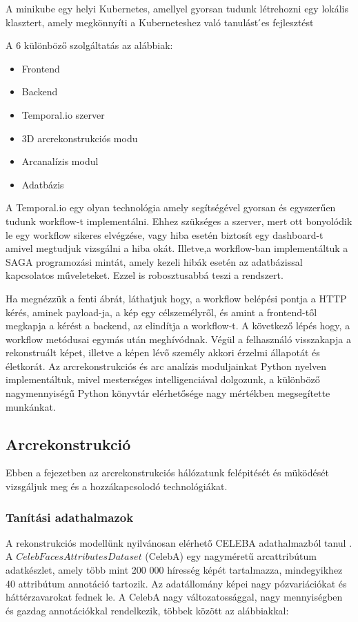 \documentclass[12pt,a4]{article}
\begin{document}
    \newpage
	\begin{mdframed}
		A minikube egy helyi Kubernetes, amellyel gyorsan tudunk létrehozni
		egy lokális klasztert, amely megkönnyíti a Kuberneteshez való tanulást
		́es fejlesztést
	\end{mdframed}

	A 6 különböző szolgáltatás az alábbiak:
	\begin{itemize}
		\item Frontend
		\item Backend
		\item Temporal.io szerver
		\item 3D arcrekonstrukciós modu
		\item Arcanalízis modul
		\item Adatbázis
	\end{itemize}

	A Temporal.io egy olyan technológia amely segítségével gyorsan és
	egyszerűen tudunk workflow-t implementálni. Ehhez szükséges a szerver,
	mert ott bonyolódik le egy workflow sikeres elvégzése, vagy hiba esetén
	biztosít egy dashboard-t amivel megtudjuk vizsgálni a hiba okát. Illetve,a
	workflow-ban implementáltuk a SAGA programozási mintát, amely kezeli
	hibák esetén az adatbázissal kapcsolatos műveleteket. Ezzel is robosztusabbá
	teszi a rendszert.
	
	Ha megnézzük a fenti ábrát, láthatjuk hogy, a workflow belépési pontja a HTTP kérés, aminek payload-ja, a kép egy célszemélyről, és amint a
	frontend-től megkapja a kérést a backend, az elindítja a workflow-t. A következő lépés hogy, a workflow metódusai egymás után meghívódnak.
	Végül a felhasználó visszakapja a rekonstruált képet, illetve a képen lévő személy akkori érzelmi állapotát és életkorát. Az arcrekonstrukciós és arc
	analízis moduljainkat Python nyelven implementáltuk, mivel mesterséges intelligenciával dolgozunk, a különböző nagymennyiségű Python könyvtár
	elérhetősége nagy mértékben megsegítette munkánkat.
	
	
	\newpage
    \subsection{Arcrekonstrukció}

    Ebben a fejezetben az arcrekonstrukciós hálózatunk felépitését és müködését vizsgáljuk meg és a hozzákapcsolodó technológiákat.

    \subsubsection{Tanítási adathalmazok}
	A rekonstrukciós modellünk nyilvánosan elérhető CELEBA adathalmazból tanul \cite{celeba}. A $CelebFaces Attributes Dataset$ (CelebA) egy nagyméretű arcattribútum adatkészlet, amely több mint 200 000 híresség képét tartalmazza, mindegyikhez 40 attribútum annotáció tartozik. Az adatállomány képei nagy pózvariációkat és háttérzavarokat fednek le. A CelebA nagy változatossággal, nagy mennyiségben és gazdag annotációkkal rendelkezik, többek között az alábbiakkal:
\end{document}
